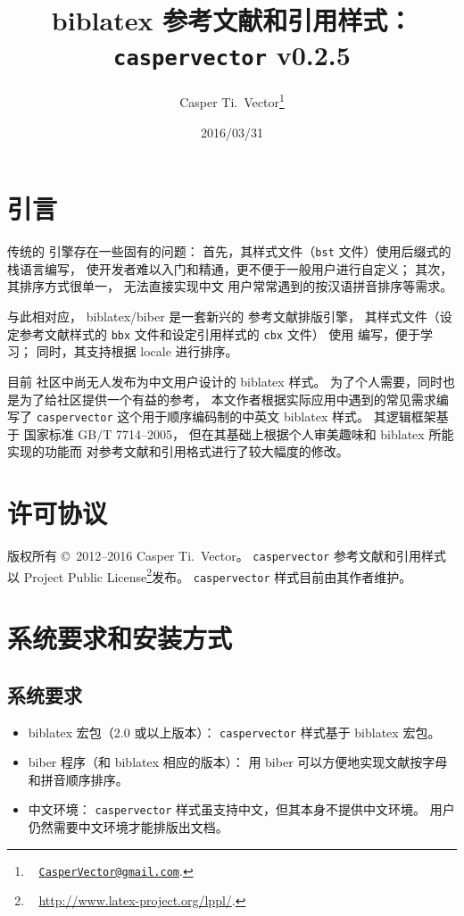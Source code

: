 \documentclass[UTF8]{ctexart}
\begin{document}
\title{\textbf{biblatex 参考文献和引用样式：\texttt{caspervector} v0.2.5}}
\author{%
	Casper Ti.\ Vector\thanks{\ %
		\href{mailto:CasperVector@gmail.com}{\texttt{CasperVector@gmail.com}}.%
	}%
}
\date{2016/03/31}
\maketitle

\section{引言}

传统的  引擎存在一些固有的问题：
首先，其样式文件（\verb|bst| 文件）使用后缀式的栈语言编写，
使开发者难以入门和精通，更不便于一般用户进行自定义；
其次，其排序方式很单一，
无法直接实现中文  用户常常遇到的按汉语拼音排序等需求。

与此相对应，
biblatex\supercite{biblatex}/biber\supercite{biber}
是一套新兴的  参考文献排版引擎，
其样式文件（设定参考文献样式的 \verb|bbx| 文件和设定引用样式的 \verb|cbx| 文件）
使用  编写，便于学习；
同时，其支持根据 locale 进行排序。

目前  社区中尚无人发布为中文用户设计的 biblatex 样式。
为了个人需要，同时也是为了给社区提供一个有益的参考，
本文作者根据实际应用中遇到的常见需求编写了
\verb|caspervector| 这个用于顺序编码制的中英文 biblatex 样式。
其逻辑框架基于
国家标准 GB/T 7714--2005\supercite{gbt7714-2005}，
但在其基础上根据个人审美趣味和 biblatex 所能实现的功能而
对参考文献和引用格式进行了较大幅度的修改。

\section{许可协议}

版权所有 \copyright\ 2012--2016 Casper Ti.\ Vector。%
\verb|caspervector| 参考文献和引用样式以
 Project Public License\footnote{\ %
	\url{http://www.latex-project.org/lppl/}.%
}发布。%
\verb|caspervector| 样式目前由其作者维护。

\section{系统要求和安装方式}
\subsection{系统要求}

\begin{itemize}
	\item biblatex 宏包（2.0 或以上版本）：%
		\verb|caspervector| 样式基于 biblatex 宏包。
	\item biber 程序（和 biblatex 相应的版本）：
		用 biber 可以方便地实现文献按字母和拼音顺序排序。
	\item 中文环境：%
		\verb|caspervector| 样式虽支持中文，但其本身不提供中文环境。
		用户仍然需要中文环境才能排版出文档。
\end{itemize}
\end{document}
